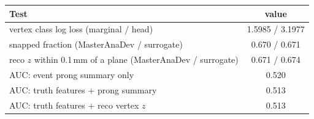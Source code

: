 \begin{tabular}{lc}
\toprule
Test & value \\
\midrule
vertex class log loss (marginal / head) & 1.5985 / 3.1977 \\
snapped fraction (MasterAnaDev / surrogate) & 0.670 / 0.671 \\
reco $z$ within 0.1\,mm of a plane (MasterAnaDev / surrogate) & 0.671 / 0.674 \\
\midrule
AUC: event prong summary only & 0.520 \\
AUC: truth features + prong summary & 0.513 \\
AUC: truth features + reco vertex $z$ & 0.513 \\
\bottomrule
\end{tabular}

